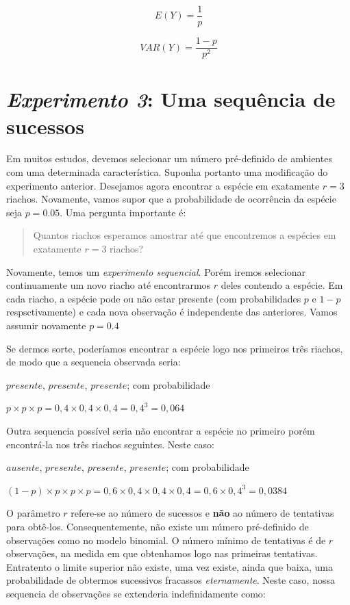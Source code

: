 \documentclass[
]{book}
\begin{document}
\[E(Y) = \frac{1}{p}\]

\[VAR(Y) = \frac{1-p}{p^2}\]

\hypertarget{experimento-3-uma-sequuxeancia-de-sucessos}{%
\section{\texorpdfstring{\emph{Experimento 3}: Uma sequência de sucessos}{Experimento 3: Uma sequência de sucessos}}\label{experimento-3-uma-sequuxeancia-de-sucessos}}

Em muitos estudos, devemos selecionar um número pré-definido de ambientes com uma determinada característica. Suponha portanto uma modificação do experimento anterior. Desejamos agora encontrar a espécie em exatamente \(r = 3\) riachos. Novamente, vamos supor que a probabilidade de ocorrência da espécie seja \(p = 0.05\). Uma pergunta importante é:

\begin{quote}
Quantos riachos esperamos amostrar até que encontremos a espécies em exatamente \(r = 3\) riachos?
\end{quote}

Novamente, temos um \emph{experimento sequencial}. Porém iremos selecionar continuamente um novo riacho até encontrarmos \(r\) deles contendo a espécie. Em cada riacho, a espécie pode ou não estar presente (com probabilidades \(p\) e \(1-p\) respsctivamente) e cada nova observação é independente das anteriores. Vamos assumir novamente \(p = 0.4\)

Se dermos sorte, poderíamos encontrar a espécie logo nos primeiros três riachos, de modo que a sequencia observada seria:

\(presente\), \(presente\), \(presente\); com probabilidade

\(p \times p \times p = 0,4 \times 0,4 \times 0,4 = 0,4^3 = 0,064\)

Outra sequencia possível seria não encontrar a espécie no primeiro porém encontrá-la nos três riachos seguintes. Neste caso:

\(ausente\), \(presente\), \(presente\), \(presente\); com probabilidade

\((1 - p) \times p \times p \times p = 0,6 \times 0,4 \times 0,4 \times 0,4 = 0,6 \times 0,4^3 = 0,0384\)

O parâmetro \(r\) refere-se ao número de sucessos e \textbf{não} ao número de tentativas para obtê-los. Consequentemente, não existe um número pré-definido de observações como no modelo binomial. O número mínimo de tentativas é de \(r\) observações, na medida em que obtenhamos logo nas primeiras tentativas. Entratento o limite superior não existe, uma vez existe, ainda que baixa, uma probabilidade de obtermos sucessivos fracassos \emph{eternamente}. Neste caso, nossa sequencia de observações se extenderia indefinidamente como:
\end{document}
